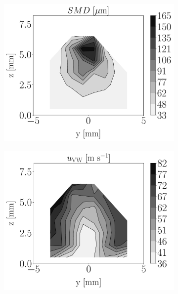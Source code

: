 \begin{figure}[h!]
\flushleft
\begin{subfigure}[b]{0.2\textwidth}
	\flushleft
	\hspace*{-0.45in}
   \includegraphics[scale=0.19]{./part2_developments/figures_ch6_lagrangian_JICF/injectors_SLI/uG100_dx10_x05_SMD_map}
\end{subfigure}
\hspace*{0.075in}
\begin{subfigure}[b]{0.2\textwidth}
	\flushleft
   \includegraphics[scale=0.19]{./part2_developments/figures_ch6_lagrangian_JICF/injectors_SLI/uG100_dx10_x05_ux_mean_vw_map}

\end{subfigure}
\end{figure}
